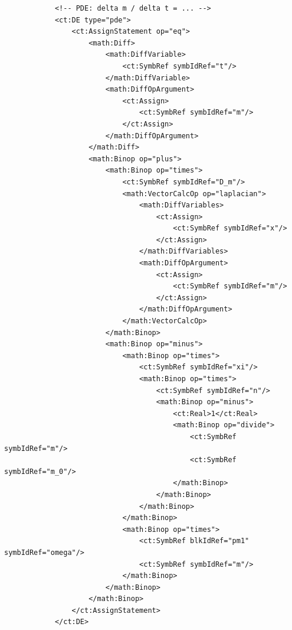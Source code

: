 \begin{lstlisting}
            <!-- PDE: delta m / delta t = ... -->
            <ct:DE type="pde">
                <ct:AssignStatement op="eq">
                    <math:Diff>
                        <math:DiffVariable>
                            <ct:SymbRef symbIdRef="t"/>
                        </math:DiffVariable>
                        <math:DiffOpArgument>
                            <ct:Assign>
                                <ct:SymbRef symbIdRef="m"/>
                            </ct:Assign>
                        </math:DiffOpArgument>
                    </math:Diff>
                    <math:Binop op="plus">
                        <math:Binop op="times">
                            <ct:SymbRef symbIdRef="D_m"/>
                            <math:VectorCalcOp op="laplacian">
                                <math:DiffVariables>
                                    <ct:Assign>
                                        <ct:SymbRef symbIdRef="x"/>
                                    </ct:Assign>
                                </math:DiffVariables>
                                <math:DiffOpArgument>
                                    <ct:Assign>
                                        <ct:SymbRef symbIdRef="m"/>
                                    </ct:Assign>
                                </math:DiffOpArgument>
                            </math:VectorCalcOp>
                        </math:Binop>
                        <math:Binop op="minus">
                            <math:Binop op="times">
                                <ct:SymbRef symbIdRef="xi"/>
                                <math:Binop op="times">
                                    <ct:SymbRef symbIdRef="n"/>
                                    <math:Binop op="minus">
                                        <ct:Real>1</ct:Real>
                                        <math:Binop op="divide">
                                            <ct:SymbRef symbIdRef="m"/>
                                            <ct:SymbRef symbIdRef="m_0"/>
                                        </math:Binop>
                                    </math:Binop>
                                </math:Binop>
                            </math:Binop>
                            <math:Binop op="times">
                                <ct:SymbRef blkIdRef="pm1" symbIdRef="omega"/>
                                <ct:SymbRef symbIdRef="m"/>
                            </math:Binop>
                        </math:Binop>
                    </math:Binop>
                </ct:AssignStatement>
            </ct:DE>
\end{lstlisting}


